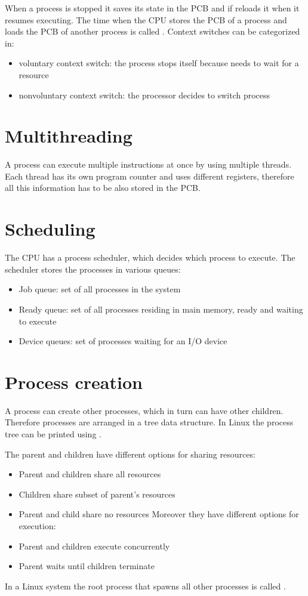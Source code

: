 When a process is stopped it saves its state in the PCB and if reloads it when it resumes executing. The time when the CPU stores the PCB of a process and loads the PCB of another process is called . Context switches can be categorized in:

\begin{itemize}
  \item voluntary context switch: the process stops itself because needs to wait for a resource
  \item nonvoluntary context switch: the processor decides to switch process
\end{itemize}

\section{Multithreading}
A process can execute multiple instructions at once by using multiple threads. Each thread has its own program counter and uses different registers, therefore all this information has to be also stored in the PCB.

\section{Scheduling}
The CPU has a process scheduler, which decides which process to execute. The scheduler stores the processes in various queues:

\begin{itemize}
  \item Job queue: set of all processes in the system
  \item Ready queue: set of all processes residing in main memory, ready and waiting to execute
  \item Device queues: set of processes waiting for an I/O device
\end{itemize}


\section{Process creation}
A process can create other  processes, which in turn can have other children. Therefore processes are arranged in a tree data structure. In Linux the process tree can be printed using .

The parent and children have different options for sharing resources:
\begin{itemize}
  \item Parent and children share all resources
  \item Children share subset of parent's resources
  \item Parent and child share no resources
  Moreover they have different options for execution:
  \item Parent and children execute concurrently
  \item Parent waits until children terminate
\end{itemize}
In a Linux system the root process that spawns all other processes is called .

